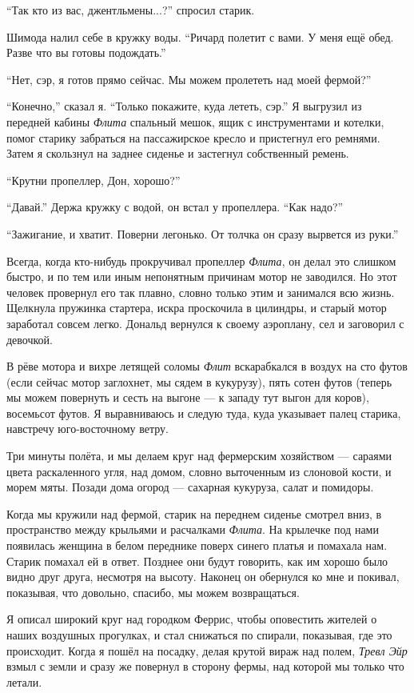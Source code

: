 ``Так кто из вас, джентльмены...?'' спросил старик.

Шимода налил себе в кружку воды.
``Ричард полетит с вами. У меня ещё обед. Разве что вы готовы подождать.''

``Нет, сэр, я готов прямо сейчас. Мы можем пролететь над моей фермой?''

``Конечно,'' сказал я. ``Только покажите, куда лететь, сэр.''
Я выгрузил из передней кабины {\it Флита\/} спальный мешок, ящик с инструментами и котелки, помог старику забраться на пассажирское кресло и пристегнул его ремнями. Затем я скользнул на заднее сиденье и застегнул собственный ремень.

``Крутни пропеллер, Дон, хорошо?''

``Давай.'' Держа кружку с водой, он встал у пропеллера. ``Как надо?''

``Зажигание, и хватит. Поверни легонько. От толчка он сразу вырвется из руки.''

Всегда, когда кто-нибудь прокручивал пропеллер {\it Флита}, он делал это слишком быстро, и по тем или иным непонятным причинам мотор не заводился. Но этот человек провернул его так плавно, словно только этим и занимался всю жизнь. Щелкнула пружинка стартера, искра проскочила в цилиндры, и старый мотор заработал совсем легко. Дональд вернулся к своему аэроплану, сел и заговорил с девочкой.

В рёве мотора и вихре летящей соломы {\it Флит\/} вскарабкался в воздух на сто футов (если сейчас мотор заглохнет, мы сядем в кукурузу), пять сотен футов (теперь мы можем повернуть и сесть на выгоне --- к западу тут выгон для коров), восемьсот футов. Я выравниваюсь и следую туда, куда указывает палец старика, навстречу юго-восточному ветру.

Три минуты полёта, и мы делаем круг над фермерским хозяйством --- сараями цвета раскаленного угля, над домом, словно выточенным из слоновой кости, и морем мяты. Позади дома огород --- сахарная кукуруза, салат и помидоры.

Когда мы кружили над фермой, старик на переднем сиденье смотрел вниз, в пространство между
крыльями и расчалками {\it Флита}. На крылечке под нами появилась женщина в белом переднике поверх
синего платья и помахала нам. Старик помахал ей в ответ. Позднее они будут говорить, как им хорошо
было видно друг друга, несмотря на высоту. Наконец он обернулся ко мне и покивал, показывая, что
довольно, спасибо, мы можем возвращаться.

Я описал широкий круг над городком Феррис, чтобы оповестить жителей о наших воздушных прогулках,
и стал снижаться по спирали, показывая, где это происходит. Когда я пошёл на посадку, делая крутой
вираж над полем, {\it Тревл Эйр\/} взмыл с земли и сразу же повернул в сторону фермы, над которой мы только что летали.

